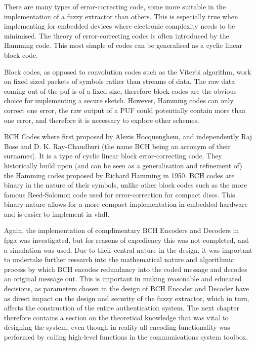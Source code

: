 There are many types of error-correcting code, some more suitable in the
implementation of a fuzzy extractor than others.
This is especially true when implementing
for embedded devices where electronic complexity needs to be minimised.
The theory of error-correcting codes is often introduced by the Hamming code.
This most simple of codes can be generalised as a cyclic linear block code.

Block codes, as opposed to convolution codes such as the Viterbi algorithm,
work on fixed sized packets of symbols rather than streams of data. The raw data
coming out of the \gls{puf} is of a fixed size, therefore block codes are the obvious
choice for implementing a secure sketch. However, Hamming codes can only correct
one error, the raw output of a PUF could potentially contain more than one
error, and therefore it is necessary to explore other schemes.

BCH Codes where first proposed by Alexis Hocquenghem, and independently Raj Bose
and D. K. Ray-Chaudhuri (the name BCH being an acronym of their surnames).
It is a type of cyclic linear block error-correcting code. They historically
build upon (and can be seen as a generalisation and refinement of) the Hamming
codes proposed by Richard Hamming in 1950. BCH codes are binary in the nature
of their symbols, unlike other block codes such as the more famous Reed-Solomon
code used for error-correction for compact discs. This binary nature allows for
a more compact implementation in embedded hardware and is easier to implement
in \gls{vhdl}.

Again, the implementation of complimentary BCH Encoders and Decoders in \gls{fpga} was
investigated, but for reasons of expediency this was not completed, and a \matlab
simulation was used. Due to their central nature in the design, it was
important to undertake further research into the mathematical nature and
algorithmic process by which BCH
encodes redundancy into the coded message and decodes an original message out.
This is important in making reasonable and educated decisions,
as parameters chosen in the design of BCH Encoder and Decoder have as direct
impact on the design and security of the fuzzy extractor, which in turn,
affects the construction of the entire authentication system.
The next chapter therefore contains a section on the theoretical knowledge that
was vital to designing the system, even though in reality all encoding
functionality was performed by calling high-level functions in the \matlab
communications system toolbox.

